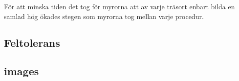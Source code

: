 \documentclass[titlepage, a4paper, 12pt]{article}
\begin{document}
För att minska tiden det tog för myrorna att av varje träsort enbart
bilda en samlad hög ökades stegen som myrorna tog mellan varje
procedur.

\subsection{Feltolerans}


\subsection{images}
\end{document}
